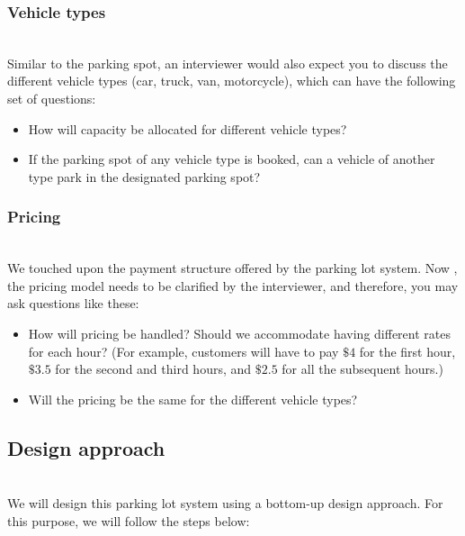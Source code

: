 \subsubsection{Vehicle types}\label{E2go_RGAjFJvVrqGzF2qa}
\\
Similar to the parking spot, an interviewer would also expect you to discuss the different vehicle types (car, truck, van, motorcycle), which can have the following set of questions:

\begin{itemize}
\item
\protect{}\label{bf7pctKaOHrstA781q5Tn}
How will capacity be allocated for different vehicle types?
\item
\protect{}\label{6x-fMJDXhzKZf8AoimpO4}
If the parking spot of any vehicle type is booked, can a vehicle of another type park in the designated parking spot?
\end{itemize}

\subsubsection{Pricing}\label{lNeaT5Umh8NpGnTsflMWm}
\\
We touched upon the payment structure offered by the parking lot system. Now , the pricing model needs to be clarified by the interviewer, and therefore, you may ask questions like these:

\begin{itemize}
\item
\protect{}\label{IEXZ_0HU3Gjal2USeqzeS}
How will pricing be handled? Should we accommodate having different rates for each hour? (For example, customers will have to pay \protect{}\label{katex_inline_qaWTXXRl7F34GrZ4i_pdI}{{{\( \$4 \)}}} for the first hour, \protect{}\label{katex_inline_Ryh-q_yCVKbYVIeE5Fr34}{{{\( \$3.5 \)}}} for the second and third hours, and \protect{}\label{katex_inline_D3Tb-1EZFaNNYCDONq789}{{{\( \$2.5 \)}}} for all the subsequent hours.)
\item
\protect{}\label{JBQ-5HwBs5QH7DAsLx34c}
Will the pricing be the same for the different vehicle types?
\end{itemize}

\subsection{Design approach}\label{cUH86ZMD2is391rK05pCi}
\\
We will design this parking lot system using a bottom-up design approach. For this purpose, we will follow the steps below:

